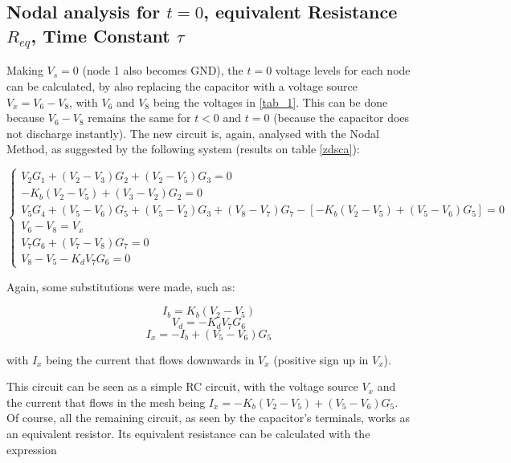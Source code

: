 \newpage
\subsection{Nodal analysis for $t=0$, equivalent Resistance $R_{eq}$, Time Constant $\tau$} \label{teo:2.2}


\vspace{3mm}
\par Making $V_s=0$ (node 1 also becomes GND), the $t=0$ voltage levels for each node can be calculated, by also replacing the capacitor with a voltage source $V_x=V_6-V_8$, with $V_6$ and $V_8$ being the voltages in \ref{tab_1}. This can be done because $V_6-V_8$ remains the same for $t<0$ and $t=0$ (because the capacitor does not discharge instantly). The new circuit is, again, analysed with the Nodal Method, as suggested by the following system (results on table \ref{zdsca}):


\begin{center}
  $\begin{cases} V_2G_1 + (V_2-V_3)G_2 + (V_2-V_5)G_3=0 \\ -K_b(V_2-V_5)+(V_3-V_2)G_2=0 \\ V_5G_4 + (V_5-V_6)G_5 + (V_5-V_2)G_3 + (V_8-V_7)G_7 - [-K_b(V_2-V_5) + (V_5-V_6)G_5] =0 \\ V_6-V_8=V_x \\ V_7G_6+(V_7-V_8)G_7=0 \\ V_8-V_5 - K_dV_7G_6=0 \end{cases}$
\end{center}


\par Again, some substitutions were made, such as:

\vspace{3mm}
\begin{equation}
  \label{a}
   I_b = K_b(V_2-V_5)
\end{equation}
\begin{equation}
  \label{aa}
   V_d=-K_dV_7G_6
\end{equation}
\begin{equation}
  \label{aaa}
   I_x = -I_b + (V_5-V_6)G_5
\end{equation}
\vspace{3mm}

with $I_x$ being the current that flows downwards in $V_x$ (positive sign up in $V_x$).

\vspace{3mm}
\par This circuit can be seen as a simple RC circuit, with the voltage source $V_x$ and the current that flows in the mesh being $I_x=-K_b(V_2-V_5) + (V_5-V_6)G_5$. Of course, all the remaining circuit, as seen by the capacitor's terminals, works as an equivalent resistor. Its equivalent resistance can be calculated with the expression

